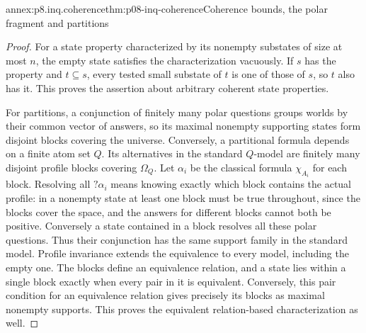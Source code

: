 \begin{annexitem}{annex:p8.inq.coherence}{thm:p08-inq-coherence}{Coherence bounds, the polar fragment and partitions}
\begin{proof}
For a state property characterized by its nonempty substates of size
at most \(n\), the empty state satisfies the characterization vacuously.
If \(s\) has the property and \(t\subseteq s\), every tested small
substate of \(t\) is one of those of \(s\), so \(t\) also has it.
This proves the assertion about arbitrary coherent state properties.

For partitions, a conjunction of finitely many polar questions groups
worlds by their common vector of answers, so its maximal nonempty
supporting states form disjoint blocks covering the universe.
Conversely, a partitional formula depends on a finite atom set \(Q\).
Its alternatives in the standard \(Q\)-model are finitely many disjoint
profile blocks covering \(\Omega_Q\). Let \(\alpha_i\) be the classical
formula \(\chi_{A_i}\) for each block. Resolving all \(?\alpha_i\)
means knowing exactly which block contains the actual profile: in a
nonempty state at least one block must be true throughout, since the
blocks cover the space, and the answers for different blocks cannot
both be positive. Conversely a state contained in a block resolves
all these polar questions. Thus their conjunction has the same support
family in the standard model. Profile invariance extends the equivalence
to every model, including the empty one.
The blocks define an equivalence relation, and a state lies within a
single block exactly when every pair in it is equivalent. Conversely,
this pair condition for an equivalence relation gives precisely its
blocks as maximal nonempty supports. This proves the equivalent
relation-based characterization as well.
\end{proof}
\end{annexitem}

